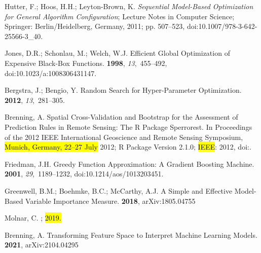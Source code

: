 \documentclass[remotesensing,article,accept,moreauthors,pdftex]{Definitions/mdpi}
\begin{document}
\begin{thebibliography}{999}
Hutter, F.; Hoos, H.H.; {Leyton-Brown}, K.
\newblock \emph{Sequential Model-Based Optimization for General Algorithm
  Configuration}; Lecture {{Notes}} in {{Computer Science}}; {Springer:
  Berlin/Heidelberg, Germany},  2011; pp. 507--523, doi:10.1007/978-3-642-25566-3\_40.

Jones, D.R.; Schonlau, M.; Welch, W.J.
\newblock Efficient Global Optimization of Expensive Black-Box Functions.
 {\bf 1998}, {\em 13},~455--492, doi:10.1023/a:1008306431147.

Bergstra, J.; Bengio, Y.
\newblock Random {{Search}} for {{Hyper}}-Parameter {{Optimization}}.
 {\bf 2012}, {\em 13},~281--305.

Brenning, A.
\newblock Spatial Cross-Validation and Bootstrap for the Assessment of
  Prediction Rules in Remote Sensing: The {{R}} Package Sperrorest.
\newblock  In Proceedings of the 2012 {{IEEE International Geoscience}} and {{Remote Sensing
  Symposium}}, \hl{Munich, Germany, 22--27 July} 2012; {R} Package Version 2.1.0; {\hl{IEEE}}:  2012,
\newblock
  doi:{\href{https://doi.org/10.1109/igarss.2012.6352393}{}}.

Friedman, J.H.
\newblock Greedy Function Approximation: A Gradient Boosting Machine.
 {\bf 2001}, {\em 29},~1189--1232, doi:10.1214/aos/1013203451.

Greenwell, B.M.; Boehmke, B.C.; McCarthy, A.J.
\newblock A {{Simple}} and {{Effective Model}}-{{Based Variable Importance
  Measure}}.
 {\bf 2018}, arXiv:1805.04755

Molnar, C.
;  \hl{2019.} %


Brenning, A.
\newblock Transforming {{Feature Space}} to {{Interpret Machine Learning
  Models}}.
 {\bf 2021}, arXiv:2104.04295


\end{thebibliography}
\end{document}
